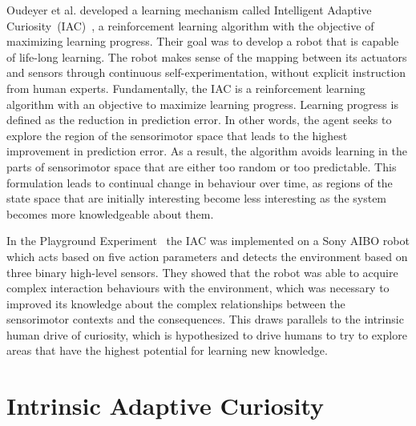Oudeyer et al. developed a learning mechanism called Intelligent Adaptive Curiosity~(IAC)~\cite{Oudeyer2007}, a reinforcement learning algorithm with the objective of maximizing learning progress. Their goal was to develop a robot that is capable of life-long learning. The robot makes sense of the mapping between its actuators and sensors through continuous self-experimentation, without explicit instruction from human experts. Fundamentally, the IAC is a reinforcement learning algorithm with an objective to maximize learning progress. Learning progress is defined as the reduction in prediction error. In other words, the agent seeks to explore the region of the sensorimotor space that leads to the highest improvement in prediction error. As a result, the algorithm avoids learning in the parts of sensorimotor space that are either too random or too predictable. This formulation leads to continual change in behaviour over time, as regions of the state space that are initially interesting become less interesting as the system becomes more knowledgeable about them. 

In the Playground Experiment~\cite{Oudeyer2005} the IAC was implemented on a Sony AIBO robot which acts based on five action parameters and detects the environment based on three binary high-level sensors. They showed that the robot was able to acquire complex interaction behaviours with the environment, which was necessary to improved its knowledge about the complex relationships between the sensorimotor contexts and the consequences. This draws parallels to the intrinsic human drive of curiosity, which is hypothesized to drive humans to try to explore areas that have the highest potential for learning new knowledge.
 
\section{Intrinsic Adaptive Curiosity}

